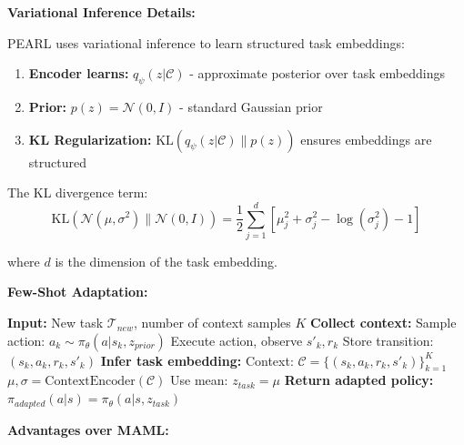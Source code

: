 \documentclass[12pt]{article}
\newcommand{\ieee}[1]{\textcolor{IEEEBlue}{\textbf{#1}}}
\begin{document}
{{			\ieee{Variational Inference Details:}
			
			PEARL uses variational inference to learn structured task embeddings:
			
			\begin{enumerate}
				\item \textbf{Encoder learns:} $q_\psi(z|\mathcal{C})$ - approximate posterior over task embeddings
				\item \textbf{Prior:} $p(z) = \mathcal{N}(0, I)$ - standard Gaussian prior
				\item \textbf{KL Regularization:} $\text{KL}(q_\psi(z|\mathcal{C}) \| p(z))$ ensures embeddings are structured
			\end{enumerate}
			
			The KL divergence term:
			\begin{equation}
			\text{KL}(\mathcal{N}(\mu, \sigma^2) \| \mathcal{N}(0, I)) = \frac{1}{2} \sum_{j=1}^d \left[ \mu_j^2 + \sigma_j^2 - \log(\sigma_j^2) - 1 \right]
			\end{equation}
			
			where $d$ is the dimension of the task embedding.
			
			\ieee{Few-Shot Adaptation:}
			
			\begin{algorithm}[H]
			\caption{PEARL Few-Shot Adaptation}
			\begin{algorithmic}[1]
			\STATE \textbf{Input:} New task $\mathcal{T}_{new}$, number of context samples $K$
			\STATE \textbf{Collect context:}
			\STATE Sample action: $a_k \sim \pi_\theta(a|s_k, z_{prior})$ 
			\STATE Execute action, observe $s'_{k}, r_k$
			\STATE Store transition: $(s_k, a_k, r_k, s'_{k})$
			\ENDFOR
			\STATE \textbf{Infer task embedding:}
			\STATE Context: $\mathcal{C} = \{(s_k, a_k, r_k, s'_{k})\}_{k=1}^K$
			\STATE $\mu, \sigma = \text{ContextEncoder}(\mathcal{C})$
			\STATE Use mean: $z_{task} = \mu$ 
			\STATE \textbf{Return adapted policy:}
			\STATE $\pi_{adapted}(a|s) = \pi_\theta(a|s, z_{task})$
			\end{algorithmic}
			\end{algorithm}
			
			\ieee{Advantages over MAML:}
			
}}
\end{document}
